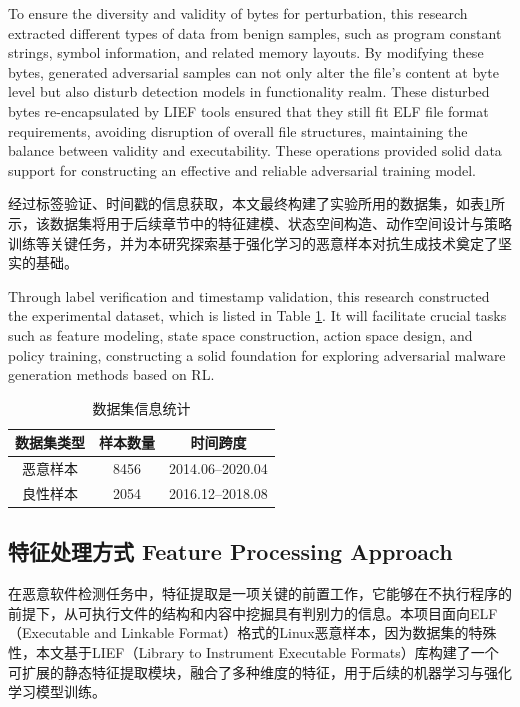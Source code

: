 To ensure the diversity and validity of bytes for perturbation, this research extracted different types of data from benign samples, such as program constant strings, symbol information, and related memory layouts. By modifying these bytes, generated adversarial samples can not only alter the file's content at byte level but also disturb  detection models in functionality realm. These disturbed bytes re-encapsulated by LIEF tools ensured that they still fit ELF file format requirements, avoiding disruption of overall file structures, maintaining the balance between validity and executability. These operations provided solid data support for constructing an effective and reliable adversarial training model.

经过标签验证、时间戳的信息获取，本文最终构建了实验所用的数据集，如表\ref{tab:5.2}所示，该数据集将用于后续章节中的特征建模、状态空间构造、动作空间设计与策略训练等关键任务，并为本研究探索基于强化学习的恶意样本对抗生成技术奠定了坚实的基础。

Through label verification and timestamp validation, this research constructed the experimental dataset, which is listed in Table \ref{tab:5.2}. It will facilitate crucial tasks such as feature modeling, state space construction, action space design, and policy training, constructing a solid foundation for exploring adversarial malware generation methods based on RL.  

\begin{table}[htbp]
	\centering
	\caption{数据集信息统计}
	\label{tab:5.2}
	\begin{tabular*}{0.9\textwidth}{@{\extracolsep{\fill}}ccc}
		\toprule
		数据集类型 & 样本数量 & 时间跨度 \\
		\midrule
		恶意样本 & 8456 & 2014.06--2020.04 \\
		良性样本 & 2054 & 2016.12--2018.08 \\
		\bottomrule
	\end{tabular*}
\end{table}

\subsection{特征处理方式 Feature Processing Approach}

在恶意软件检测任务中，特征提取是一项关键的前置工作，它能够在不执行程序的前提下，从可执行文件的结构和内容中挖掘具有判别力的信息。本项目面向ELF（Executable and Linkable Format）格式的Linux恶意样本，因为数据集的特殊性，本文基于LIEF（Library to Instrument Executable Formats）库构建了一个可扩展的静态特征提取模块，融合了多种维度的特征，用于后续的机器学习与强化学习模型训练。

